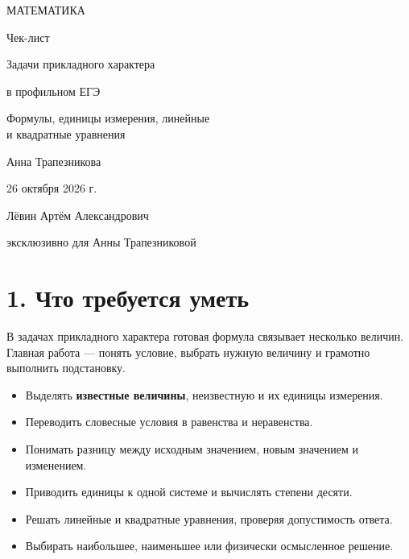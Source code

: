 \documentclass[a4paper,11pt]{article}
\newcommand{\key}[1]{\textcolor{darkaccent}{\textbf{#1}}}
\newcommand{\CheckItem}{\(\square\)}
\begin{document}
\begin{titlepage}
\thispagestyle{empty}
\centering
\vspace*{18mm}
{\large\color{darkaccent} МАТЕМАТИКА\par}
\vspace{19mm}
{\LARGE Чек-лист\par}
\vspace{11mm}
{\Large\color{accent} Задачи прикладного характера\par}
{\Large\color{accent} в профильном ЕГЭ\par}
\vspace{16mm}
{\normalsize Формулы, единицы измерения, линейные\\
и квадратные уравнения\par}
\vfill
{\large Анна Трапезникова\par}
\vspace{15mm}
{26 октября 2026 г.\par}
\vspace{16mm}
{\small Лёвин Артём Александрович\par}
{\small эксклюзивно для Анны Трапезниковой\par}
\vspace{18mm}
\vspace{8mm}
\end{titlepage}

\section*{1. Что требуется уметь}
В задачах прикладного характера готовая формула связывает несколько величин.
Главная работа --- понять условие, выбрать нужную величину и грамотно выполнить подстановку.

\begin{itemize}
\item[\CheckItem] Выделять \key{известные величины}, неизвестную и их единицы измерения.
\item[\CheckItem] Переводить словесные условия в равенства и неравенства.
\item[\CheckItem] Понимать разницу между исходным значением, новым значением и изменением.
\item[\CheckItem] Приводить единицы к одной системе и вычислять степени десяти.
\item[\CheckItem] Решать линейные и квадратные уравнения, проверяя допустимость ответа.
\item[\CheckItem] Выбирать наибольшее, наименьшее или физически осмысленное решение.
\end{itemize}
\end{document}

